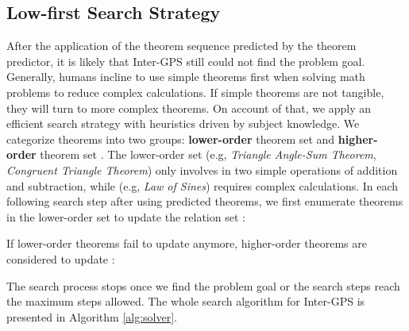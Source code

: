 \documentclass[11pt,a4paper]{article}
\begin{document}
\subsection{Low-first Search Strategy}

After the application of the theorem sequence predicted by the theorem predictor, it is likely that Inter-GPS still could not find the problem goal. Generally, humans incline to use simple theorems first when solving math problems to reduce complex calculations. If simple theorems are not tangible, they will turn to more complex theorems. On account of that, we apply an efficient search strategy with heuristics driven by subject knowledge. We categorize theorems into two groups: \textbf{lower-order} theorem set  and \textbf{higher-order} theorem set . The lower-order set  (e.g, \textit{Triangle Angle-Sum Theorem}, \textit{Congruent Triangle Theorem}) only involves in two simple operations of addition and subtraction, while  (e.g, \textit{Law of 
Sines}) requires complex calculations. In each following search step after using predicted theorems, we first enumerate theorems in the lower-order set  to update the relation set :

If lower-order theorems fail to update  anymore, higher-order theorems are considered to update :




The search process stops once we find the problem goal  or the search steps reach the maximum steps allowed. The whole search algorithm for Inter-GPS is presented in Algorithm \ref{alg:solver}.
\end{document}
